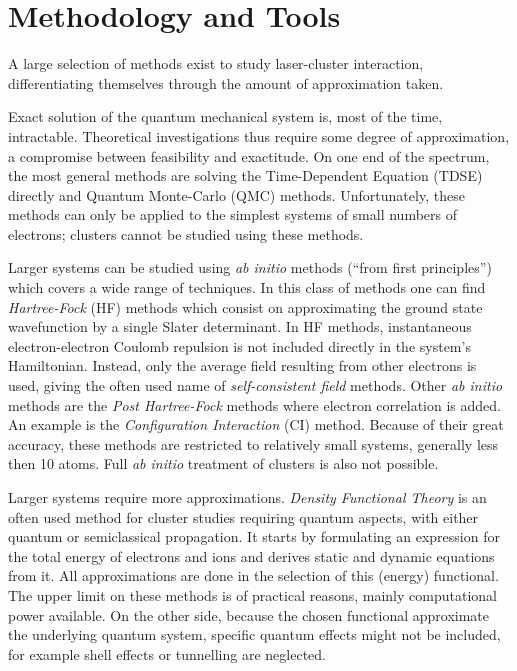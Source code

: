 \clearpage
\section{Methodology and Tools}
\label{section:tools}

A large selection of methods exist to study laser-cluster interaction,
differentiating themselves through the amount of approximation taken.

Exact solution of the quantum mechanical system is, most of the time,
intractable. Theoretical investigations thus require some degree of
approximation, a compromise between feasibility and exactitude. On one end of
the spectrum, the most general methods are solving the
Time-Dependent \schrodinger Equation (TDSE) directly and Quantum Monte-Carlo
(QMC) methods. Unfortunately, these methods can only be applied to the simplest
systems of small numbers of electrons; clusters cannot be studied using these
methods.


Larger systems can be studied using \textit{ab initio} methods (``from
first principles'') which covers a wide range of techniques. In this class of
methods one can find \textit{Hartree-Fock} (HF) methods which consist on
approximating the ground state wavefunction by a single Slater determinant.
In HF methods, instantaneous electron-electron Coulomb repulsion is not
included directly in the system's Hamiltonian. Instead, only the average field
resulting from other electrons is used, giving the often used name of
\textit{self-consistent field} methods. Other \textit{ab
initio} methods are the \textit{Post Hartree-Fock} methods where electron
correlation is added. An example is the \textit{Configuration Interaction} (CI)
method. Because of their great accuracy, these methods are restricted to
relatively small systems, generally less then 10 atoms. Full \textit{ab initio}
treatment of clusters is also not possible.

Larger systems require
more approximations. \textit{Density Functional Theory}
is an often used method for cluster studies requiring quantum aspects, with
either quantum or semiclassical propagation. It starts by formulating an
expression for the total energy of electrons and ions and derives static and
dynamic equations from it. All approximations are done in the selection of this
(energy) functional. The upper limit on these methods is of practical reasons,
mainly computational power available. On the other side, because the chosen
functional approximate the underlying quantum system, specific quantum effects
might not be included, for example shell effects or tunnelling are neglected.

